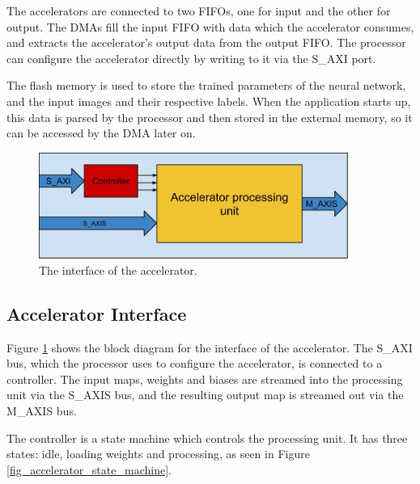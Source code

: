 The accelerators are connected to two FIFOs, one for input and the other for output. The DMAs fill the input FIFO with data which the accelerator consumes, and extracts the accelerator's output data from the output FIFO. The processor can configure the accelerator directly by writing to it via the S\_AXI port.

The flash memory is used to store the trained parameters of the neural network, and the input images and their respective labels. When the application starts up, this data is parsed by the processor and then stored in the external memory, so it can be accessed by the DMA later on.  



\begin{figure}[h!]
  \centering
      \includegraphics[width=0.9\textwidth]{Figures/Method/accelerator_interface}
    \caption{The interface of the accelerator.}
    \label{fig_accelerator_interface}
\end{figure}


\subsection{Accelerator Interface}

Figure \ref{fig_accelerator_interface} shows the block diagram for the interface of the accelerator. The S\_AXI bus, which the processor uses to configure the accelerator, is connected to a controller. The input maps, weights and biases are streamed into the processing unit via the S\_AXIS bus, and the resulting output map is streamed out via the M\_AXIS bus.

The controller is a state machine which controls the processing unit. It has three states: idle, loading weights and processing, as seen in Figure \ref{fig_accelerator_state_machine}.

